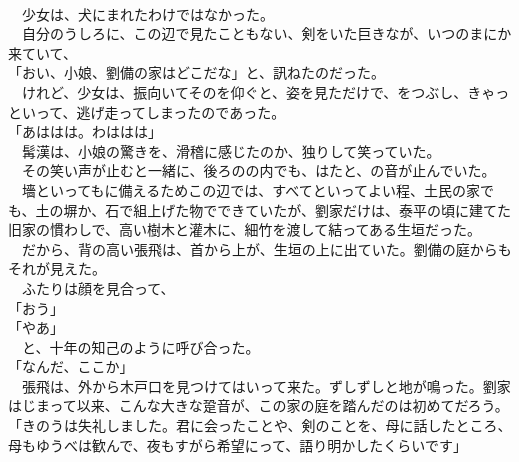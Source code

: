 \documentclass[
  paper=a5,
  fontsize=10pt,
  jafontsize=9.5pt,
  tate,                  %
  open_bracket_pos=nibu, %
]{jlreq}
\begin{document}
\\


　少女は、犬にまれたわけではなかった。\\


　自分のうしろに、この辺で見たこともない、剣をいた巨きなが、いつのまにか来ていて、\\


「おい、小娘、劉備の家はどこだな」と、訊ねたのだった。\\


　けれど、少女は、振向いてそのを仰ぐと、姿を見ただけで、をつぶし、きゃっといって、逃げ走ってしまったのであった。\\


「あははは。わははは」\\


　髯漢は、小娘の驚きを、滑稽に感じたのか、独りして笑っていた。\\


　その笑い声が止むと一緒に、後ろのの内でも、はたと、の音が止んでいた。\\


　墻といってもに備えるためこの辺では、すべてといってよい程、土民の家でも、土の塀か、石で組上げた物でできていたが、劉家だけは、泰平の頃に建てた旧家の慣わしで、高い樹木と灌木に、細竹を渡して結ってある生垣だった。\\


　だから、背の高い張飛は、首から上が、生垣の上に出ていた。劉備の庭からもそれが見えた。\\


　ふたりは顔を見合って、\\


「おう」\\


「やあ」\\


　と、十年の知己のように呼び合った。\\


「なんだ、ここか」\\


　張飛は、外から木戸口を見つけてはいって来た。ずしずしと地が鳴った。劉家はじまって以来、こんな大きな跫音が、この家の庭を踏んだのは初めてだろう。\\


「きのうは失礼しました。君に会ったことや、剣のことを、母に話したところ、母もゆうべは歓んで、夜もすがら希望にって、語り明かしたくらいです」\\
\end{document}
